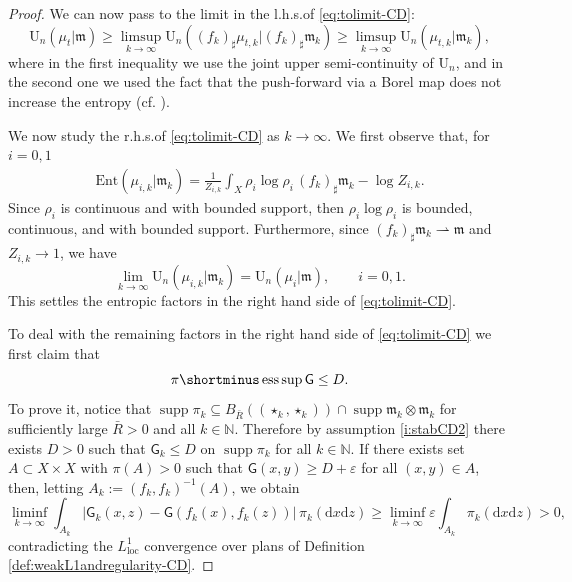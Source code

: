 \documentclass[11pt,a4paper]{article}
\theoremstyle{plain}
\theoremstyle{definition}
\theoremstyle{remark}
\numberwithin{equation}{section}
\newcommand{\N}{\mathbb{N}} %
\DeclareMathOperator{\supp}{\mathrm{supp}}
\newcommand{\Ent}{\mathrm{Ent}}
\newcommand{\U}{\mathrm{U}}
\newcommand{\loc}{\mathrm{loc}}
\DeclareMathOperator*{\esssup}{ess\,sup}
\newcommand{\di}{\mathrm{d}}
\newcommand{\mm}{\mathfrak m}
\newcommand{\sfG}{\mathsf G}
\begin{document}
\begin{proof}
We can now pass to the limit in the l.h.s.\@ of \eqref{eq:tolimit-CD}:
\begin{equation}
\U_n(\mu_t|\mm)  \geq \limsup_{k\to \infty} \U_n((f_k)_\sharp\mu_{t,k}|(f_{k})_\sharp \mm_k) \geq \limsup_{k\to \infty} \U_n(\mu_{t,k}|\mm_k),
\end{equation}
where in the first inequality we use the joint upper semi-continuity of $\U_n$, and in the second one we used the fact that the push-forward via a Borel map does not increase the entropy (cf. \cite[Thm.\@ 29.20 (i), (ii)]{Vil}).

We now study the r.h.s.\@ of \eqref{eq:tolimit-CD} as $k\to \infty$. We first observe that, for $i=0,1$
\begin{align}
\Ent(\mu_{i,k}|\mm_k)  =\frac{1}{Z_{i,k}} \int_{X} \rho_i\log\rho_i\, (f_k)_\sharp \mm_k  - \log Z_{i,k}.
\end{align}
Since $\rho_i$ is continuous and with bounded support, then $\rho_i\log\rho_i$ is bounded, continuous, and with bounded support. Furthermore, since $(f_k)_\sharp \mm_k \rightharpoonup \mm$ and $Z_{i,k}\to 1$, we have
\begin{equation}
\lim_{k\to\infty} \U_n(\mu_{i,k}|\mm_k)  = \U_n(\mu_{i}|\mm),\qquad i=0,1.
\end{equation}
This settles the entropic factors in the right hand side of \eqref{eq:tolimit-CD}. 

To deal with the remaining factors in the right hand side of \eqref{eq:tolimit-CD} we first claim that 
\begin{equation}\label{eq:piesssup}
\pi\shortminus\esssup \sfG \leq D.
\end{equation}
To prove it, notice that $\supp\pi_k \subseteq B_{\bar{R}}((\star_k,\star_k))\cap\supp\mm_k\otimes\mm_k$ for sufficiently large $\bar{R}>0$ and all $k\in \N$. Therefore by assumption \ref{i:stabCD2} there exists $D>0$ such that $\sfG_k \leq D$ on $\supp\pi_k$ for all $k\in\N$. If there exists set $A\subset X\times X$ with $\pi(A)>0$ such that $\sfG(x,y) \geq D+\varepsilon$ for all $(x,y)\in A$, then, letting $A_k:=(f_k,f_k)^{-1}(A)$, we obtain
\begin{equation}
\liminf_{k\to \infty}\int_{A_k}|\sfG_k(x,z)-\sfG(f_k(x),f_k(z))| \, \pi_k(\di x \di z) \geq\liminf_{k\to \infty} \varepsilon\int_{A_k}\pi_k(\di x \di z) >0,
\end{equation}
contradicting the $L^1_\loc$ convergence over plans of Definition \ref{def:weakL1andregularity-CD}.


\end{proof}
\end{document}
